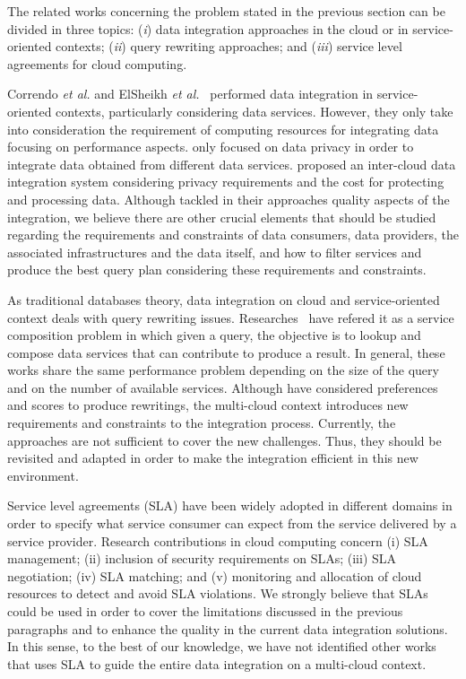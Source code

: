 The related works concerning the problem stated in the previous section can be divided in three topics: (\textit{i}) data integration approaches in the cloud or in service-oriented contexts; (\textit{ii}) query rewriting approaches; and (\textit{iii}) service level agreements for cloud computing.

Correndo \textit{et al.} and ElSheikh \textit{et al.}~\cite{Correndo2010,ElSheikh2013} performed data integration in service-oriented contexts, particularly considering data services. However, they only take into consideration the requirement of computing resources for integrating data focusing on performance aspects. \cite{YauY08} only focused on data privacy in order to integrate data obtained from different data services. \cite{Tian2010} proposed an inter-cloud data integration system considering privacy requirements and the cost for protecting and processing data. Although \cite{Tian2010,YauY08} tackled in their approaches quality aspects of the integration, we believe there are other crucial elements that should be studied regarding the requirements and constraints of data consumers, data providers, the associated infrastructures and the data itself, and how to filter services and produce the best query plan considering these requirements and constraints.

As traditional databases theory, data integration on cloud and service-oriented context deals with query rewriting issues. Researches~\cite{ba2014,Barhamgi2010,Benouaret2011,Umberto} have refered it as a service composition problem in which given a query, the objective is to lookup and compose data services that can contribute to produce a result. In general, these works share the same performance problem depending on the size of the query and on the number of available services. Although \cite{ba2014,Benouaret2011} have considered preferences and scores to produce rewritings, the multi-cloud context introduces new requirements and constraints to the integration process. Currently, the approaches are not sufficient to cover the new challenges. Thus, they should be revisited and adapted in order to make the integration efficient in this new environment. 

Service level agreements (SLA) have been widely adopted in different domains in order to specify what service consumer can expect from the service delivered by a service provider. Research contributions in cloud computing concern (i) SLA management; (ii) inclusion of security requirements on SLAs; (iii) SLA negotiation; (iv) SLA matching; and (v) monitoring and allocation of cloud resources to detect and avoid SLA violations. 
We strongly believe that SLAs could be used in order to cover the limitations discussed in the previous paragraphs and to enhance the quality in the current data integration solutions. In this sense, to the best of our knowledge, we have not identified other works that uses SLA to guide the entire data integration on a multi-cloud context.
